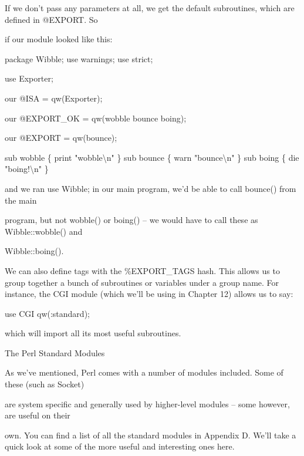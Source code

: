 \documentclass[a4paper,11pt]{book}
\begin{document}
\noindent 

\noindent If we don't pass any parameters at all, we get the default subroutines, which are defined in @EXPORT. So

\noindent if our module looked like this:

\noindent 

\noindent package Wibble; use warnings; use strict;

\noindent 

\noindent use Exporter;

\noindent our @ISA = qw(Exporter);

\noindent our @EXPORT\_OK = qw(wobble bounce boing);

\noindent our @EXPORT = qw(bounce);

\noindent 

\noindent sub wobble \{ print "wobble\textbackslash n" \} sub bounce \{ warn  "bounce\textbackslash n" \} sub boing  \{ die "boing!\textbackslash n" \}

\noindent 

\noindent and we ran use Wibble; in our main program, we'd be able to call bounce() from the main

\noindent program, but not wobble() or boing() -- we would have to call these as Wibble::wobble() and

\noindent Wibble::boing().

\noindent 

\noindent We can also define tags with the \%EXPORT\_TAGS hash. This allows us to group together a bunch of subroutines or variables under a group name. For instance, the CGI module (which we'll be using in Chapter 12) allows us to say:

\noindent 

\noindent use CGI qw(:standard);

\noindent 

\noindent which will import all its most useful subroutines.

\noindent 

\noindent 

\noindent The Perl Standard Modules

\noindent 

\noindent As we've mentioned, Perl comes with a number of modules included. Some of these (such as Socket)

\noindent are system specific and generally used by higher-level modules -- some however, are useful on their

\noindent own. You can find a list of all the standard modules in Appendix D. We'll take a quick look at some of the more useful and interesting ones here.
\end{document}

